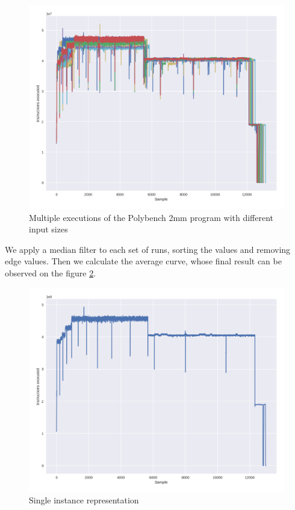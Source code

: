 \begin{figure}[H]
    \centering
    \includegraphics[width=\textwidth]{fingerprint/figures/workflow.png}
    \caption{Multiple executions of the Polybench 2mm program with different input sizes}
    \label{fig:multiple_exec}
\end{figure}

We apply a median filter to each set of runs, sorting the values and removing edge values.
Then we calculate the average curve, whose final result can be observed on the figure \ref{fig:single_curve}.

\begin{figure}[H]
    \centering
    \includegraphics[width=\textwidth]{fingerprint/figures/workflow_1.png}
    \caption{Single instance representation}
    \label{fig:single_curve}
\end{figure}

